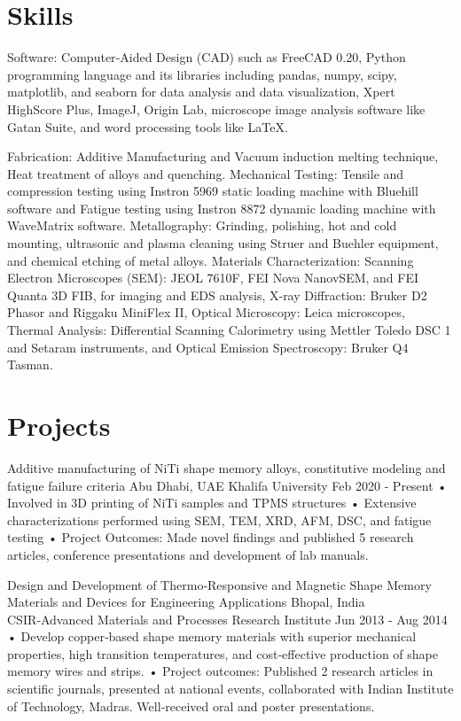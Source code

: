 \documentclass[a4paper]{article}
\begin{document}
\section*{Skills}
Software: Computer‑Aided Design (CAD) such as FreeCAD 0.20, Python programming language and its libraries including
pandas, numpy, scipy, matplotlib, and seaborn for data analysis and data visualization, Xpert HighScore Plus,
ImageJ, Origin Lab, microscope image analysis software like Gatan Suite, and word processing tools like LaTeX.

Fabrication: Additive Manufacturing and Vacuum induction melting technique, Heat treatment of alloys and quenching.
Mechanical Testing: Tensile and compression testing using Instron 5969 static loading machine with Bluehill software
and Fatigue testing using Instron 8872 dynamic loading machine with WaveMatrix software.
Metallography: Grinding, polishing, hot and cold mounting, ultrasonic and plasma cleaning using Struer and Buehler
equipment, and chemical etching of metal alloys.
Materials Characterization: Scanning Electron Microscopes (SEM): JEOL 7610F, FEI Nova NanovSEM, and FEI Quanta
3D FIB, for imaging and EDS analysis, X‑ray Diffraction: Bruker D2 Phasor and Riggaku MiniFlex II, Optical Microscopy:
Leica microscopes, Thermal Analysis: Differential Scanning Calorimetry using Mettler Toledo DSC 1 and Setaram instruments,
and Optical Emission Spectroscopy: Bruker Q4 Tasman.

\section*{Projects}
Additive manufacturing of NiTi shape memory alloys, constitutive
modeling and fatigue failure criteria Abu Dhabi, UAE
Khalifa University Feb 2020 ‑ Present
• Involved in 3D printing of NiTi samples and TPMS structures
• Extensive characterizations performed using SEM, TEM, XRD, AFM, DSC, and fatigue testing
• Project Outcomes: Made novel findings and published 5 research articles, conference presentations and development
of lab manuals.

Design and Development of Thermo‑Responsive and Magnetic Shape
Memory Materials and Devices for Engineering Applications Bhopal, India
CSIR‑Advanced Materials and Processes Research Institute Jun 2013 ‑ Aug 2014
• Develop copper‑based shape memory materials with superior mechanical properties, high transition temperatures,
and cost‑effective production of shape memory wires and strips.
• Project outcomes: Published 2 research articles in scientific journals, presented at national events, collaborated
with Indian Institute of Technology, Madras. Well‑received oral and poster presentations.
\end{document}
